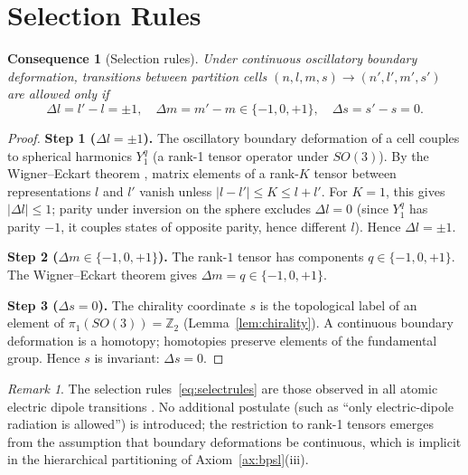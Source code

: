 \documentclass[11pt,twocolumn,a4paper]{article}
\theoremstyle{axiomstyle}
\theoremstyle{conseqstyle}
\newtheorem{consequence}{Consequence}
\theoremstyle{definition}
\theoremstyle{remark}
\newtheorem*{remark}{Remark}
\newcommand{\Integer}{\mathbb{Z}}
\begin{document}
\section{Selection Rules}
\label{sec:selectionrules}

\begin{consequence}[Selection rules]
\label{cons:selectionrules}
Under continuous oscillatory boundary deformation, transitions between partition cells $(n,l,m,s)\to(n',l',m',s')$ are allowed only if
\begin{equation}
\Delta l=l'-l=\pm 1,\quad \Delta m=m'-m\in\{-1,0,+1\},\quad \Delta s=s'-s=0.
\label{eq:selectrules}
\end{equation}
\end{consequence}

\begin{proof}
\textbf{Step 1 ($\Delta l=\pm 1$).} The oscillatory boundary deformation of a cell couples to spherical harmonics $Y_{1}^{q}$ (a rank-1 tensor operator under $SO(3)$). By the Wigner--Eckart theorem \citep{wigner1959,sakurai2017}, matrix elements of a rank-$K$ tensor between representations $l$ and $l'$ vanish unless $|l-l'|\le K\le l+l'$. For $K=1$, this gives $|\Delta l|\le 1$; parity under inversion on the sphere excludes $\Delta l=0$ (since $Y_{1}^{q}$ has parity $-1$, it couples states of opposite parity, hence different $l$). Hence $\Delta l=\pm 1$.

\textbf{Step 2 ($\Delta m\in\{-1,0,+1\}$).} The rank-$1$ tensor has components $q\in\{-1,0,+1\}$. The Wigner--Eckart theorem gives $\Delta m=q\in\{-1,0,+1\}$.

\textbf{Step 3 ($\Delta s=0$).} The chirality coordinate $s$ is the topological label of an element of $\pi_{1}(SO(3))=\Integer_{2}$ (Lemma~\ref{lem:chirality}). A continuous boundary deformation is a homotopy; homotopies preserve elements of the fundamental group. Hence $s$ is invariant: $\Delta s=0$.
\end{proof}

\begin{remark}
The selection rules~\eqref{eq:selectrules} are those observed in all atomic electric dipole transitions \citep{herzberg1944,nistasd}. No additional postulate (such as ``only electric-dipole radiation is allowed'') is introduced; the restriction to rank-1 tensors emerges from the assumption that boundary deformations be continuous, which is implicit in the hierarchical partitioning of Axiom~\ref{ax:bpsl}(iii).
\end{remark}
\end{document}
